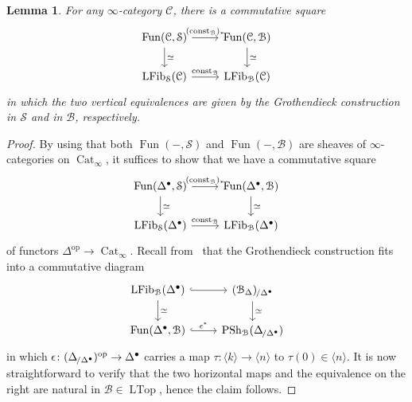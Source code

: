 \documentclass[reqno]{amsart}
\numberwithin{equation}{subsection}
\theoremstyle{plain}
\newtheorem{lemma}[equation]{Lemma}
\theoremstyle{definition}
\let\scr=\mathcal
\def\BB{\scr B}
\def\CC{\scr C}
\def\SS{\scr S}
\DeclareMathOperator{\PSh}{PSh}
\DeclareMathOperator{\Cat}{Cat}
\DeclareMathOperator{\LFib}{LFib}
\DeclareMathOperator{\LTop}{LTop}
\DeclareMathOperator{\Fun}{Fun}
\DeclareMathOperator{\const}{const}
\newcommand{\op}{\mathrm{op}}
\newcommand{\ord}[1]{\langle#1\rangle}
\newcommand{\Over}[2]{#1_{\hspace{-1pt}/#2}}
\newcommand{\Simp}[1]{#1_{\Delta}}
\newcommand{\CatS}{\Cat_{\infty}}
\begin{document}
\begin{lemma}
	\label{lem:InternalExternalPresheavesFibrations}
	For any $\infty$-category $\CC$, there is a commutative square
	\begin{equation*}
	\begin{tikzcd}
	\Fun(\CC,\SS)\arrow[r, "(\const_{\BB})_\ast"]\arrow[d, "\simeq"] & \Fun(\CC,\BB)\arrow[d, "\simeq"]\\
	\LFib_{\SS}(\CC)\arrow[r, "\const_{\BB}"] & \LFib_{\BB}(\CC)
	\end{tikzcd}
	\end{equation*}
	in which the two vertical equivalences are given by the Grothendieck construction in $\SS$ and in $\BB$, respectively.
\end{lemma}
\begin{proof}
	By using that both $\Fun(-,\SS)$ and $\Fun(-,\BB)$ are sheaves of $\infty$-categories on $\CatS$, it suffices to show that we have a commutative square
	\begin{equation*}
		\begin{tikzcd}
		\Fun(\Delta^\bullet,\SS)\arrow[r, "(\const_{\BB})_\ast"]\arrow[d, "\simeq"] & \Fun(\Delta^\bullet,\BB)\arrow[d, "\simeq"]\\
		\LFib_{\SS}(\Delta^\bullet)\arrow[r, "\const_{\BB}"] & \LFib_{\BB}(\Delta^\bullet)
		\end{tikzcd}
	\end{equation*}
	of functors $\Delta^{\op}\to\CatS$. Recall from~\cite[\S~4.5]{Martini2021} that the Grothendieck construction fits into a commutative diagram
	\begin{equation*}
	\begin{tikzcd}
	\LFib_{\BB}(\Delta^\bullet)\arrow[r, hookrightarrow]\arrow[d, "\simeq"] & \Over{(\Simp\BB)}{\Delta^\bullet}\arrow[d,"\simeq"]\\
	\Fun(\Delta^\bullet,\BB)\arrow[r, hookrightarrow, "\epsilon^\ast"] & \PSh_{\BB}(\Over{\Delta}{\Delta^\bullet})
	\end{tikzcd}
	\end{equation*}
	in which $\epsilon\colon (\Over{\Delta}{\Delta^\bullet})^\op\to\Delta^\bullet$ carries a map $\tau\colon \ord{k}\to\ord{n}$ to $\tau(0)\in\ord{n}$. It is now straightforward to verify that the two horizontal maps and the equivalence on the right are natural in $\BB\in\LTop$, hence the claim follows.
\end{proof}
\end{document}
